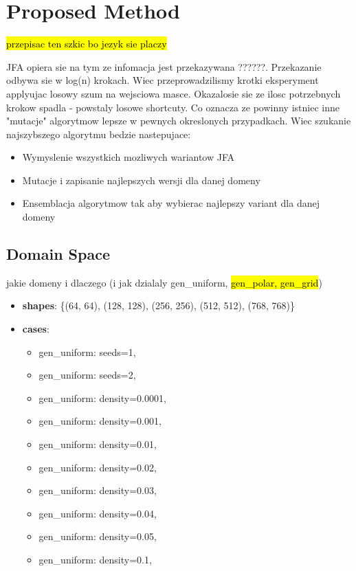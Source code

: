\documentclass{article}
\begin{document}
\section{Proposed Method} %

\hl{przepisac ten szkic bo jezyk sie placzy}

JFA opiera sie na tym ze infomacja jest przekazywana ??????.  Przekazanie odbywa
sie w log(n) krokach. Wiec przeprowadzilismy krotki eksperyment applyujac losowy
szum na wejsciowa masce. Okazalosie sie ze ilosc potrzebnych krokow spadla -
powstaly losowe shortcuty.  Co oznacza ze powinny istniec inne "mutacje"
algorytmow lepsze w pewnych okreslonych przypadkach.  Wiec szukanie najszybszego
algorytmu bedzie nastepujace:

\begin{itemize}
\item Wymyslenie wszystkich mozliwych wariantow JFA
\item Mutacje i zapisanie najlepszych wersji dla danej domeny
\item Ensemblacja algorytmow tak aby wybierac najlepszy variant dla danej domeny
\end{itemize}

\subsection{Domain Space} %

jakie domeny i dlaczego (i jak dzialaly gen\_uniform, \hl{gen\_polar, gen\_grid})

\begin{itemize}
	\item \textbf{shapes}: \{(64, 64), (128, 128), (256, 256), (512, 512), (768,
		768)\}
	\item \textbf{cases}:
        \begin{itemize}
			\item gen\_uniform: seeds=1,
			\item gen\_uniform: seeds=2,
			\item gen\_uniform: density=0.0001,
			\item gen\_uniform: density=0.001,
			\item gen\_uniform: density=0.01,
			\item gen\_uniform: density=0.02,
			\item gen\_uniform: density=0.03,
			\item gen\_uniform: density=0.04,
			\item gen\_uniform: density=0.05,
			\item gen\_uniform: density=0.1,
		\end{itemize}
\end{itemize}
\end{document}
